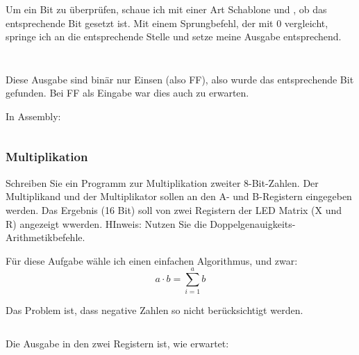 Um ein Bit zu überprüfen, schaue ich mit einer Art Schablone und \txor, ob das
entsprechende Bit gesetzt ist. Mit einem Sprungbefehl, der mit 0 vergleicht,
springe ich an die entsprechende Stelle und setze meine Ausgabe entsprechend.

\inputminted[fontsize=\small, linenos]{cpp}{../Prototypen/f.cpp}

\begin{multicols}{9}
	\inputminted[fontsize=\footnotesize]{text}{f.txt}
\end{multicols}

Diese Ausgabe sind binär nur Einsen (also FF), also wurde das entsprechende Bit
gefunden. Bei FF als Eingabe war dies auch zu erwarten.

In Assembly:

\inputminted[fontsize=\small, linenos]{text}{../Assembly/f.s}
\subsubsection{Multiplikation}

\begin{problem}
	Schreiben Sie ein Programm zur Multiplikation zweiter 8-Bit-Zahlen. Der
	Multiplikand und der Multiplikator sollen an den A- und B-Registern
	eingegeben werden. Das Ergebnis (16 Bit) soll von zwei Registern der LED
	Matrix (X und R) angezeigt wwerden. HInweis: Nutzen Sie die
	Doppelgenauigkeits-Arithmetikbefehle.
\end{problem}

Für diese Aufgabe wähle ich einen einfachen Algorithmus, und zwar:
\[
	a \cdot b = \sum_{i = 1}^{a} b
\]

Das Problem ist, dass negative Zahlen so nicht berücksichtigt werden.

\inputminted[fontsize=\small, linenos]{cpp}{../Prototypen/g.cpp}

Die Ausgabe in den zwei Registern ist, wie erwartet:

\begin{multicols}{9}
	\inputminted[fontsize=\footnotesize]{text}{g.txt}
\end{multicols}


\FloatBarrier
\IfFileExists{\bibliographyfile}{
	
}{}



